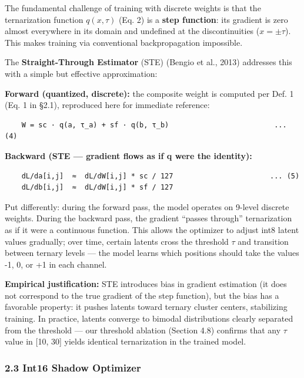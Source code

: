 The fundamental challenge of training with discrete weights is that the
ternarization function \(q(x, \tau)\) (Eq. 2) is a \textbf{step
function}: its gradient is zero almost everywhere in its domain and
undefined at the discontinuities (\(x = \pm\tau\)). This makes training
via conventional backpropagation impossible.

The \textbf{Straight-Through Estimator} (STE) (Bengio et al., 2013)
addresses this with a simple but effective approximation:

\textbf{Forward (quantized, discrete):} the composite weight is computed
per Def. 1 (Eq. 1 in §2.1), reproduced here for immediate reference:

\begin{verbatim}
    W = sc · q(a, τ_a) + sf · q(b, τ_b)                         ... (4)
\end{verbatim}

\textbf{Backward (STE --- gradient flows as if q were the identity):}

\begin{verbatim}
    dL/da[i,j]  ≈  dL/dW[i,j] * sc / 127                       ... (5)
    dL/db[i,j]  ≈  dL/dW[i,j] * sf / 127
\end{verbatim}

Put differently: during the forward pass, the model operates on 9-level
discrete weights. During the backward pass, the gradient ``passes
through'' ternarization as if it were a continuous function. This allows
the optimizer to adjust int8 latent values gradually; over time, certain
latents cross the threshold \(\tau\) and transition between ternary
levels --- the model learns which positions should take the values -1,
0, or +1 in each channel.

\textbf{Empirical justification:} STE introduces bias in gradient
estimation (it does not correspond to the true gradient of the step
function), but the bias has a favorable property: it pushes latents
toward ternary cluster centers, stabilizing training. In practice,
latents converge to bimodal distributions clearly separated from the
threshold --- our threshold ablation (Section 4.8) confirms that any
\(\tau\) value in {[}10, 30{]} yields identical ternarization in the
trained model.

\subsubsection{2.3 Int16 Shadow Optimizer}\label{int16-shadow-optimizer}

